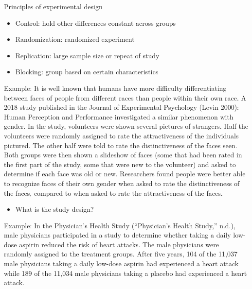 \documentclass[
]{report}
\providecommand{\tightlist}{%
  \setlength{\itemsep}{0pt}\setlength{\parskip}{0pt}}
\begin{document}
Principles of experimental design

\begin{itemize}
\item
  Control: hold other differences constant across groups
  \vspace{0.1in}
\item
  Randomization: randomized experiment
  \vspace{0.1in}
\item
  Replication: large sample size or repeat of study
  \vspace{0.1in}
\item
  Blocking: group based on certain characteristics
\end{itemize}

\vspace{0.1in}

\newpage

Example: It is well known that humans have more difficulty differentiating between faces of people from different races than people within their own race. A 2018 study published in the Journal of Experimental Psychology (Levin 2000): Human Perception and Performance investigated a similar phenomenon with gender. In the study, volunteers were shown several pictures of strangers. Half the volunteers were randomly assigned to rate the attractiveness of the individuals pictured. The other half were told to rate the distinctiveness of the faces seen. Both groups were then shown a slideshow of faces (some that had been rated in the first part of the study, some that were new to the volunteer) and asked to determine if each face was old or new. Researchers found people were better able to recognize faces of their own gender when asked to rate the distinctiveness of the faces, compared to when asked to rate the attractiveness of the faces.

\begin{itemize}
\tightlist
\item
  What is the study design?
\end{itemize}

\vspace{0.5in}

Example: In the Physician's Health Study ({``Physician's Health Study,''} n.d.), male physicians participated in a study to determine whether taking a daily low-dose aspirin reduced the risk of heart attacks. The male physicians were randomly assigned to the treatment groups. After five years, 104 of the 11,037 male physicians taking a daily low-dose aspirin had experienced a heart attack while 189 of the 11,034 male physicians taking a placebo had experienced a heart attack.
\end{document}

